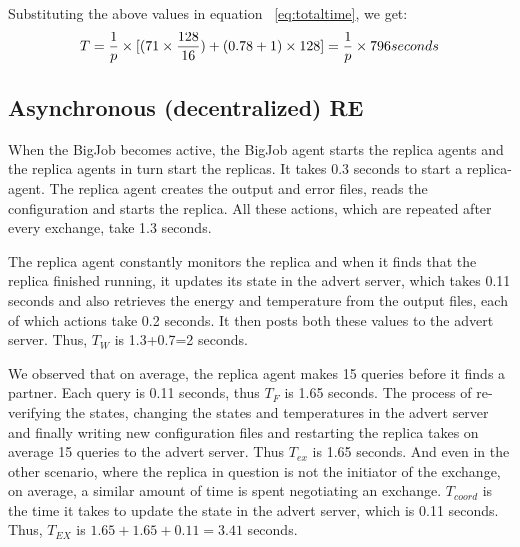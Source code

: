 \documentclass{rspublic}
\begin{document}

Substituting the above values in equation ~\ref{eq:totaltime}, we get:
\begin{eqnarray}
T=  {1 \over p} \times {[ {(71\times {128\over 16}}) + (0.78 + 1)\times 128]} = {1 \over p} \times 796 seconds
\label{eq:cent}
\end{eqnarray}


\subsection{Asynchronous (decentralized) RE}

When the BigJob becomes active, the BigJob agent starts the replica agents and
the replica agents in turn start the replicas. It takes 0.3 seconds to start a replica-agent.
The replica agent creates the output
and error files, reads the configuration and starts the replica. All
these actions, which are repeated after every exchange, take 1.3
seconds.

The replica agent constantly monitors the replica and when it finds
that the replica finished running, it updates its state in the advert
server, which takes 0.11 seconds and also retrieves the energy and
temperature from the output files, each of which actions take 0.2
seconds. It then posts both these values to the advert server. Thus,
$T_W$ is 1.3+0.7=2 seconds.

We observed that on average, the replica agent makes 15 queries before it
finds a partner. Each query is 0.11 seconds, thus $T_F$ is 1.65
seconds. The process of re-verifying the states, changing the states and temperatures in the advert server and finally writing new configuration files and restarting the replica takes on average 15 queries to the advert server. Thus $T_{ex}$ is 1.65 seconds. And even in the other scenario, where the replica in question is not the initiator of the exchange, on average, a similar amount of time is spent negotiating an exchange.
$T_{coord}$ is the
time it takes to update the state in the advert server, which is 0.11
seconds. Thus, $T_{EX}$ is $1.65+1.65+0.11= 3.41$ seconds.
\end{document}
